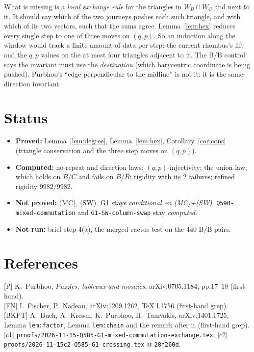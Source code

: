 \documentclass[11pt]{article}
\theoremstyle{definition}
\begin{document}
What is missing is a \emph{local exchange rule} for the triangles in $W_B\cap W_C$ and next to it. It should say which of the two journeys
pushes each such triangle, and with which of its two vectors, such that the sums agree. Lemma~\ref{lem:hex} reduces every single step to one of
three moves on $(q,p)$. So an induction along the window would track a finite amount of data per step: the current rhombus's lift and the
$q,p$ values on the at most four triangles adjacent to it. The B/B control says the invariant must use the \emph{destination} (which
barycentric coordinate is being pushed). Purbhoo's ``edge perpendicular to the midline'' is not it: it is the same-direction invariant.

\section{Status}
\begin{itemize}
\item \textbf{Proved:} Lemma~\ref{lem:degree}, Lemma~\ref{lem:hex}, Corollary~\ref{cor:cons} (triangle conservation and the three step moves on $(q,p)$).
\item \textbf{Computed:} no-repeat and direction laws; $(q,p)$-injectivity; the union law, which holds on $B/C$ and fails on $B/B$; rigidity with its $2$ failures; refined rigidity $9982/9982$.
\item \textbf{Not proved:} (MC), (SW). G1 stays \emph{conditional on (MC)+(SW)}. \texttt{Q590-mixed-commutation} and
\texttt{G1-SW-column-swap} stay \emph{computed}.
\item \textbf{Not run:} brief step 4(a), the merged cactus test on the $440$ B/B pairs.
\end{itemize}

\section*{References}
{[P]} K.~Purbhoo, \emph{Puzzles, tableaux and mosaics}, arXiv:0705.1184, pp.17--18 (first-hand).\\
{[FN]} I.~Fischer, P.~Nadeau, arXiv:1209.1262, TeX l.1756 (first-hand grep).\\
{[BKPT]} A.~Buch, A.~Kresch, K.~Purbhoo, H.~Tamvakis, arXiv:1401.1725, Lemma \texttt{lem:factor}, Lemma \texttt{lem:chain} and the remark after it (first-hand grep).\\
{[c1]} \texttt{proofs/2026-11-15-Q585-G1-mixed-commutation-exchange.tex}; {[c2]} \texttt{proofs/2026-11-15c2-Q585-G1-crossing.tex} @ \texttt{28f260d}.
\end{document}
